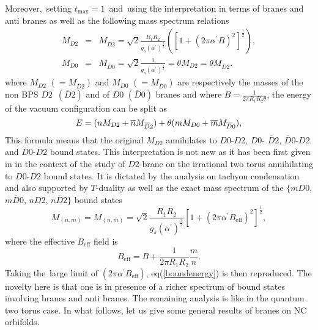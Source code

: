 \documentclass[a4paper,12pt]{article}
\begin{document}
Moreover,\ setting $t_{\text{max}}=1$\ and\ using the interpretation in
terms of branes and anti branes as well as the following mass spectrum
relations
\begin{eqnarray}
M_{D2} &=&M_{\overline{D}2}=\sqrt{2}\frac{R_{1}R_{2}}{g_{s}\left( \alpha
^{\prime }\right) ^{\frac{3}{2}}}\left( \left[ 1+\left( 2\pi \alpha ^{\prime
}B\right) ^{2}\right] ^{\frac{1}{2}}\right) , \\
M_{D0} &=&M_{\overline{D}0}=\sqrt{2}\frac{1}{g_{s}\left( \alpha ^{\prime
}\right) ^{\frac{1}{2}}}=\theta M_{D2}=\theta M_{\overline{D}2}.
\end{eqnarray}
where $M_{D2}$ $(=M_{\overline{D}2})$ and $M_{D0}$ $(=M_{\overline{D}0})$
are respectively the masses of the non BPS $D2$\ $\left( \overline{D}%
2\right) $ and of $D0$ $(\overline{D}0)$ branes and where $B=\frac{1}{2\pi
R_{1}R_{2}\theta }$, the energy of the vacuum configuration can be split as
\begin{equation}
E=(nM_{D2}+\overline{n}M_{\overline{D}2})+\theta (mM_{D0}+\overline{m}M_{%
\overline{D}0}),  \label{boundenergy}
\end{equation}
This formula means that the original $M_{D2}$ annihilates to $D0$-$D2$, $D0$-%
$\overline{D}2$, $\overline{D}0$-$D2$ and $\overline{D}0$-$\overline{D}2$
bound states. This interpretation is not new as it has been first
given in \cite{g} in the context of the study of $D2$-brane on the
irrational two torus annihilating to $D0$-$D2$ bound states. It is dictated
by the analysis on tachyon condensation and also supported by $T$-duality as
well as the exact mass spectrum of the $\{mD0$, $\overline{m}\overline{D}0$,
$nD2$, $\overline{n}\overline{D}2\}$ bound states
\begin{equation}
M_{\left( n,m\right) }=M_{\left( \overline{n},\overline{m}\right) }=\sqrt{2}%
\frac{R_{1}R_{2}}{g_{s}\left( \alpha ^{\prime }\right) ^{\frac{3}{2}}}\left[
1+\left( 2\pi \alpha ^{\prime }B_{\text{eff}}\right) ^{2}\right] ^{\frac{1}{2%
}},
\end{equation}
where the effective $B_{\text{eff}}$ field is
\begin{equation}
B_{\text{eff}}=B+\frac{1}{2\pi R_{1}R_{2}}\frac{m}{n}.
\end{equation}
Taking the\ large limit of $\left( 2\pi \alpha ^{\prime }B_{\text{eff}%
}\right) $, eq(\ref{boundenergy}) is then reproduced. The novelty
here is that one is in presence of a richer spectrum of bound
states involving branes and anti branes. The remaining analysis is
like in the quantum two torus case. In what follows, let us give
some general results of branes on NC orbifolds.
\end{document}
